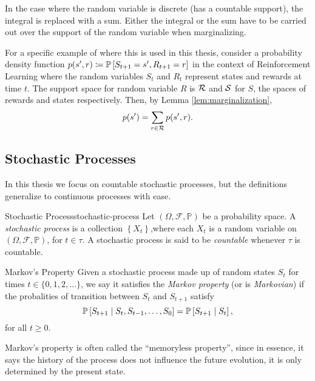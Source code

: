 In the case where the random variable is discrete (has a countable support), the
integral is replaced with a sum. Either the integral or the sum have to be
carried out over the support of the random variable when marginalizing.

For a specific example of where this is used in this thesis, consider a
probability density function $p(s', r) \coloneqq \mathbb{P}\left[S_{t+1} = s', R_{t+1} = r\right]$
in the context of Reinforcement Learning where the random variables $S_t$ and
$R_t$ represent states and rewards at time $t$. The support space for random
variable $R$ is $\mathcal{R}$ and $\mathcal{S}$ for $S$, the spaces of rewards and
states respectively. Then, by Lemma
\ref{lem:marginalization},
\[
    p(s') = \sum_{r \in \mathcal{R}} p(s', r).
\] 

\subsection{Stochastic Processes}

In this thesis we focus on countable stochastic processes, but the definitions
generalize to continuous processes with ease.

\begin{dfn}{Stochastic Process}{stochastic-process}
    Let $(\Omega, \mathcal{F}, \mathbb{P})$ be a probability space. A
    \emph{stochastic process} is a collection $\left\{ X_t \right\}$,where each
    $X_t$ is a random variable on $(\Omega, \mathcal{F}, \mathbb{P})$, for $t
    \in \tau$. A stochastic process is said to be \emph{countable} whenever
    $\tau$ is countable.
\end{dfn}

\begin{dfn}{Markov's Property}{}
    Given a stochastic process made up of random states $S_t$ for times $t \in
    \{0, 1, 2, \dots\}$, we say it satisfies the \emph{Markov property} (or is
    \emph{Markovian}) if the probalities of transition between $S_t$ and
    $S_{t+1}$ satisfy
    \[
        \mathbb{P}\left[S_{t+1} \mid S_t, S_{t-1}, \dots, S_0 \right] = \mathbb{P}\left[S_{t+1} \mid S_t\right],
    \]
    for all $t \geq 0$.
\end{dfn}

Markov's property is often called the ``memoryless property'', since in essence,
it says the history of the process does not influence the future evolution, it
is only determined by the present state.


